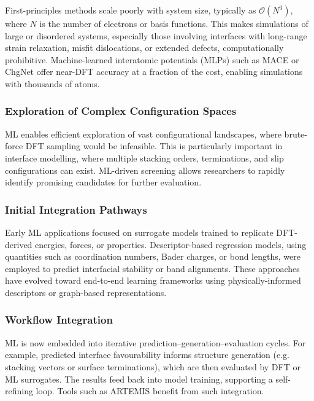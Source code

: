 First-principles methods scale poorly with system size, typically as \( \mathcal{O}(N^3) \), where \( N \) is the number of electrons or basis functions. This makes simulations of large or disordered systems, especially those involving interfaces with long-range strain relaxation, misfit dislocations, or extended defects, computationally prohibitive. Machine-learned interatomic potentials (MLPs) such as MACE or ChgNet offer near-DFT accuracy at a fraction of the cost, enabling simulations with thousands of atoms.

\subsubsection{Exploration of Complex Configuration Spaces}

ML enables efficient exploration of vast configurational landscapes, where brute-force DFT sampling would be infeasible. This is particularly important in interface modelling, where multiple stacking orders, terminations, and slip configurations can exist. ML-driven screening allows researchers to rapidly identify promising candidates for further evaluation.

\subsubsection{Initial Integration Pathways}

Early ML applications focused on surrogate models trained to replicate DFT-derived energies, forces, or properties. Descriptor-based regression models, using quantities such as coordination numbers, Bader charges, or bond lengths, were employed to predict interfacial stability or band alignments. These approaches have evolved toward end-to-end learning frameworks using physically-informed descriptors or graph-based representations.

\subsubsection{Workflow Integration}

ML is now embedded into iterative prediction--generation--evaluation cycles. For example, predicted interface favourability informs structure generation (e.g. stacking vectors or surface terminations), which are then evaluated by DFT or ML surrogates. The results feed back into model training, supporting a self-refining loop. Tools such as ARTEMIS benefit from such integration.


